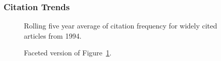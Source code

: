 \documentclass[
  10pt,
  letterpaper,
  DIV=11,
  numbers=noendperiod,
  twoside]{scrartcl}
\begin{document}
\subsubsection*{Citation Trends}\label{citation-trends-18}

\begin{figure}


\caption{\label{fig-citation-spaghetti-1994}Rolling five year average of
citation frequency for widely cited articles from 1994.}

\end{figure}%

\begin{figure}


\caption{\label{fig-citation-facet-1994}Faceted version of
Figure~\ref{fig-citation-spaghetti-1994}.}

\end{figure}%
\end{document}
